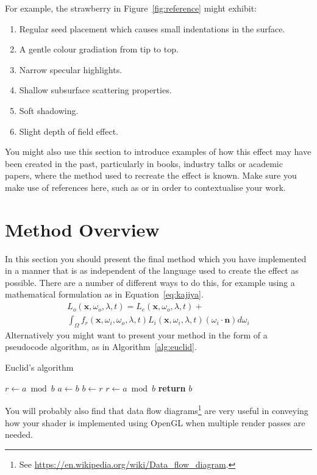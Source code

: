\documentclass[]{acmsiggraph}
\begin{document}
For example, the strawberry in Figure~\ref{fig:reference} might exhibit:
\begin{enumerate}
 \item Regular seed placement which causes small indentations in the surface.
 \item A gentle colour gradiation from tip to top.
 \item Narrow specular highlights.
 \item Shallow subsurface scattering properties.
 \item Soft shadowing.
 \item Slight depth of field effect.
\end{enumerate}
You might also use this section to introduce examples of how this effect may have been created in the past, particularly in books, industry talks or academic papers, where the method used to recreate the effect is known. Make sure you make use of references here, such as \cite{rtr08} or \cite{pbr10} in order to contextualise your work.

\section{Method Overview} \label{sec:overview}
In this section you should present the final method which you have implemented in a manner that is as independent of the language used to create the effect as possible. There are a number of different ways to do this, for example using a mathematical formulation as in Equation~\ref{eq:kajiya}.
\begin{multline}\label{eq:kajiya}
L_o \left( \mathbf{x},\omega_o,\lambda,t \right) = L_e\left(\mathbf{x},\omega_o,\lambda,t \right) + \\
   \int_\Omega f_r \left(\mathbf{x},\omega_i,\omega_o,\lambda,t\right) L_i\left(\mathbf{x},\omega_i,\lambda,t\right) \left(\omega_i \cdot \mathbf{n}\right) d\omega_i
\end{multline}
Alternatively you might want to present your method in the form of a pseudocode algorithm, as in Algorithm~\ref{alg:euclid}. 
\begin{algorithm}
\caption{Euclid’s algorithm}\label{alg:euclid}
\begin{algorithmic}[1]
\State $r\gets a\bmod b$
\State $a\gets b$
\State $b\gets r$
\State $r\gets a\bmod b$
\EndWhile\label{euclidendwhile}
\State \textbf{return} $b$
\EndProcedure
\end{algorithmic}
\end{algorithm}
You will probably also find that data flow diagrams\footnote{See \url{https://en.wikipedia.org/wiki/Data_flow_diagram}.} are very useful in conveying how your shader is implemented using OpenGL when multiple render passes are needed.
\end{document}
